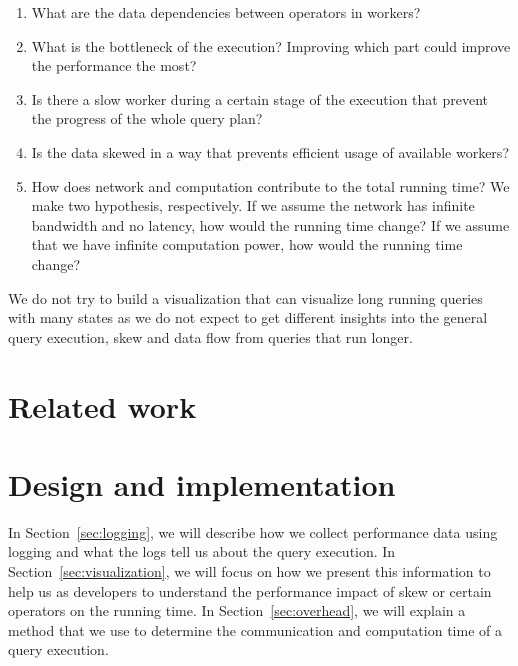 \documentclass[11pt]{scrartcl}
\begin{document}
\begin{enumerate}
  \item What are the data dependencies between operators in workers?
  \item What is the bottleneck of the execution? Improving which part could improve the performance the most?
  \item Is there a slow worker during a certain stage of the execution that prevent the progress of the whole query plan?
  \item Is the data skewed in a way that prevents efficient usage of available workers?
  \item How does network and computation contribute to the total running time? We make two hypothesis, respectively. If we assume the network has infinite bandwidth and no latency, how would the running time change? If we assume that we have infinite computation power, how would the running time change?

\end{enumerate}

We do not try to build a visualization that can visualize long running queries with many states as we do not expect to get different insights into the general query execution, skew and data flow from queries that run longer.


\section{Related work}


\section{Design and implementation}

In Section~\ref{sec:logging}, we will describe how we collect performance data using logging and what the logs tell us about the query execution. In Section~\ref{sec:visualization}, we will focus on how we present this information to help us as developers to understand the performance impact of skew or certain operators on the running time. In Section~\ref{sec:overhead}, we will explain a method that we use to determine the communication and computation time of a query execution.
\end{document}
